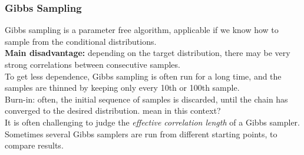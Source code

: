 \begin{frame}
\frametitle{Gibbs Sampling}

Gibbs sampling is a parameter free algorithm, applicable if we know
how to sample from the conditional distributions.\\[1ex]

{\bf Main disadvantage:} depending on the target distribution, there may be
very strong correlations between consecutive samples.\\[1ex]

To get less dependence, Gibbs sampling is often run for a long time,
and the samples are thinned by keeping only every 10th or 100th
sample.\\[1ex]

Burn-in: often, the initial sequence of samples is discarded, until the chain has converged to the desired distribution.  mean in this context?\\[1ex]

It is often challenging to judge the \emph{effective correlation
  length} of a Gibbs sampler. Sometimes several Gibbs samplers are run
from different starting points, to compare results.\\[1ex]


\end{frame}



